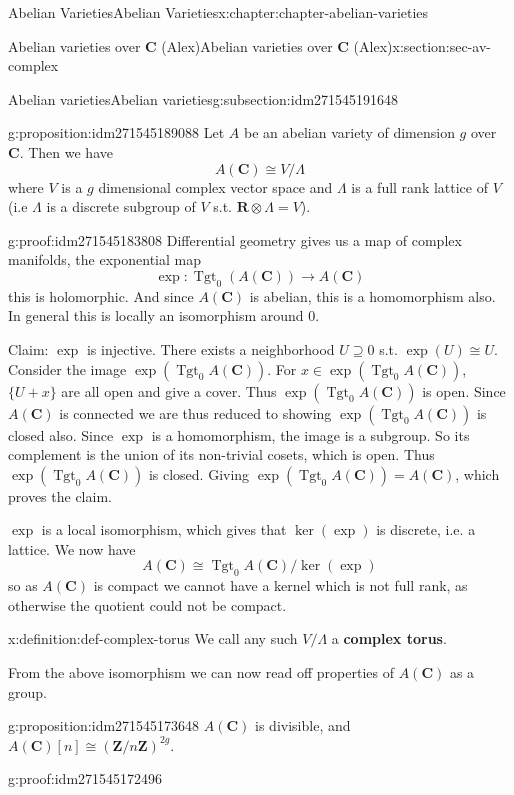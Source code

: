 \documentclass[oneside,10pt,]{book}
\newcommand{\terminology}[1]{\textbf{#1}}
\numberwithin{equation}{section}
\newcommand{\lb}{[}
\newcommand{\rb}{]}
\newcommand{\ZZ}{\mathbf{Z}}
\newcommand{\RR}{\mathbf{R}}
\newcommand{\CC}{\mathbf{C}}
\DeclareMathOperator{\Tgt}{Tgt}
\begin{document}
\begin{chapterptx}{Abelian Varieties}{}{Abelian Varieties}{}{}{x:chapter:chapter-abelian-varieties}
\begin{sectionptx}{Abelian varieties over \(\CC\) (Alex)}{}{Abelian varieties over \(\CC\) (Alex)}{}{}{x:section:sec-av-complex}
\begin{subsectionptx}{Abelian varieties}{}{Abelian varieties}{}{}{g:subsection:idm271545191648}
\begin{proposition}{}{}{g:proposition:idm271545189088}
Let \(A\) be an abelian variety of dimension \(g\) over \(\CC\). Then we have%
\begin{equation*}
A(\CC) \cong V/\Lambda
\end{equation*}
where \(V\) is a \(g\) dimensional complex vector space and \(\Lambda\) is a full rank lattice of \(V\) (i.e \(\Lambda\) is a discrete subgroup of \(V\) s.t. \(\RR\otimes \Lambda  = V\)).%
\end{proposition}
\begin{proofptx}{}{g:proof:idm271545183808}
Differential geometry gives us a map of complex manifolds, the exponential map%
\begin{equation*}
\exp\colon\Tgt_0(A(\CC)) \to A(\CC)
\end{equation*}
this is holomorphic. And since \(A(\CC)\) is abelian, this is a homomorphism also. In general this is locally an isomorphism around 0.%
\par
Claim: \(\exp\) is injective. There exists a neighborhood \(U\supseteq 0\) s.t. \(\exp(U) \cong U\). Consider the image \(\exp(\Tgt_0 A(\CC))\). For \(x\in \exp(\Tgt_0 A(\CC))\), \(\{U+x\}\) are all open and give a cover. Thus \(\exp(\Tgt_0A(\CC))\) is open. Since \(A(\CC)\) is connected we are thus reduced to showing \(\exp(\Tgt_0 A(\CC))\) is closed also. Since \(\exp\) is a homomorphism, the image is a subgroup. So its complement is the union of its non-trivial cosets, which is open. Thus \(\exp(\Tgt_0A(\CC))\) is closed. Giving \(\exp(\Tgt_0A(\CC)) = A(\CC)\), which proves the claim.%
\par
\(\exp\) is a local isomorphism, which gives that \(\ker(\exp)\) is discrete, i.e. a lattice. We now have%
\begin{equation*}
A(\CC) \cong \Tgt_0A(\CC)/ \ker(\exp)
\end{equation*}
so as \(A(\CC)\) is compact we cannot have a kernel which is not full rank, as otherwise the quotient could not be compact.%
\end{proofptx}
\begin{definition}{}{x:definition:def-complex-torus}%
We call any such \(V/\Lambda\) a \terminology{complex torus}.%
\end{definition}
From the above isomorphism we can now read off properties of \(A(\CC)\) as a group.%
\begin{proposition}{}{}{g:proposition:idm271545173648}%
\(A(\CC)\) is divisible, and \(A(\CC)\lb n\rb \cong (\ZZ/n\ZZ)^{2g}\).%
\end{proposition}
\begin{proofptx}{}{g:proof:idm271545172496}

\end{proofptx}
\end{subsectionptx}
\end{sectionptx}
\end{chapterptx}
\end{document}
